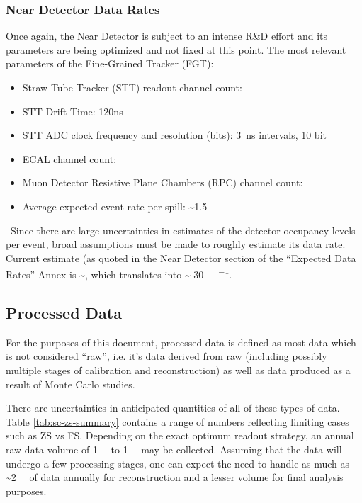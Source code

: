 \subsubsection{Near Detector Data Rates}
Once again, the Near Detector is subject to an intense R\&D effort and
its parameters are being optimized and not fixed at this point. The
most relevant parameters of the Fine-Grained Tracker (FGT):
\begin{itemize}
\item   Straw Tube Tracker (STT) readout channel count: \ndsstchannels
\item STT Drift Time: 120ns
\item STT ADC clock frequency and resolution (bits): \SI{3}{\ns} intervals, 10 bit
\item ECAL channel count: \ndecalchannels
\item Muon Detector Resistive Plane Chambers (RPC) channel count: \ndmuidchannels
\item Average expected event rate per spill: \textasciitilde 1.5
\end{itemize}
\ Since there are large uncertainties in estimates of the detector
occupancy levels per event, broad assumptions must be made to roughly
estimate its data rate. Current estimate (as quoted in the Near
Detector section of the ``Expected Data Rates'' Annex is
\textasciitilde \nddatarate, which translates into \textasciitilde
\SI{30}{\tera\byte\per\year}.


\subsection{Processed Data}
\label{sec:detectors-sc-infrastructure-processed-data}
For the purposes of this document, processed data is defined as most
data which is not considered ``raw'', i.e. it's data derived from raw
(including possibly multiple stages of calibration and reconstruction)
as well as data produced as a result of Monte Carlo studies.

There are uncertainties in anticipated quantities of all of these
types of data. Table \ref{tab:sc-zs-summary} contains a range of
numbers reflecting limiting cases such as ZS vs FS.  Depending on the
exact optimum readout strategy, an annual raw data volume of
\SI{1}{\tera\byte} to \SI{1}{\peta\byte} may be collected.  Assuming
that the data will undergo a few processing stages, one can expect the
need to handle as much as \textasciitilde \SI{2}{\peta\byte} of data
annually for reconstruction and a lesser volume for final analysis
purposes.

